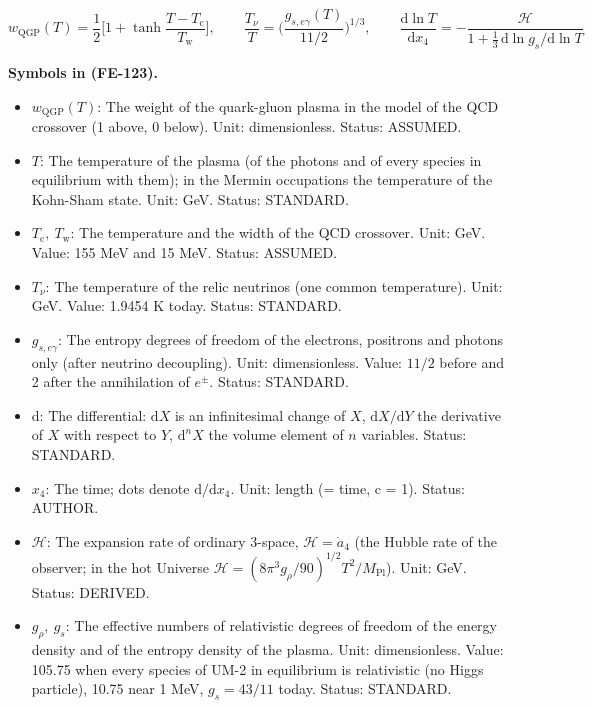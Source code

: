 \documentclass[
  10pt,
]{article}
\providecommand{\tightlist}{%
  \setlength{\itemsep}{0pt}\setlength{\parskip}{0pt}}
\begin{document}
\[
w_{\mathrm{QGP}}(T) = \frac12\Big[1 + \tanh\frac{T - T_{\mathrm{c}}}{T_{\mathrm{w}}}\Big],\qquad
\frac{T_\nu}{T} = \Big(\frac{g_{s,e\gamma}(T)}{11/2}\Big)^{1/3},\qquad
\frac{\mathrm{d}\ln T}{\mathrm{d}x_4} = -\frac{\mathcal{H}}{1 + \frac13\,\mathrm{d}\ln g_s/\mathrm{d}\ln
 T} \tag{FE-123}
\]

\textbf{Symbols in (FE-123).}

\begin{itemize}
\tightlist
\item
  \(w_{\mathrm{QGP}}(T)\): The weight of the quark-gluon plasma in the
  model of the QCD crossover (1 above, 0 below). Unit: dimensionless.
  Status: ASSUMED.
\item
  \(T\): The temperature of the plasma (of the photons and of every
  species in equilibrium with them); in the Mermin occupations the
  temperature of the Kohn-Sham state. Unit: GeV. Status: STANDARD.
\item
  \(T_{\mathrm{c}},\ T_{\mathrm{w}}\): The temperature and the width of
  the QCD crossover. Unit: GeV. Value: 155 MeV and 15 MeV. Status:
  ASSUMED.
\item
  \(T_\nu\): The temperature of the relic neutrinos (one common
  temperature). Unit: GeV. Value: 1.9454 K today. Status: STANDARD.
\item
  \(g_{s,e\gamma}\): The entropy degrees of freedom of the electrons,
  positrons and photons only (after neutrino decoupling). Unit:
  dimensionless. Value: \(11/2\) before and 2 after the annihilation of
  \(e^\pm\). Status: STANDARD.
\item
  \(\mathrm{d}\): The differential: \(\mathrm{d}X\) is an infinitesimal
  change of \(X\), \(\mathrm{d}X/\mathrm{d}Y\) the derivative of \(X\)
  with respect to \(Y\), \(\mathrm{d}^nX\) the volume element of \(n\)
  variables. Status: STANDARD.
\item
  \(x_4\): The time; dots denote \(\mathrm{d}/\mathrm{d}x_4\). Unit:
  length (= time, c = 1). Status: AUTHOR.
\item
  \(\mathcal{H}\): The expansion rate of ordinary 3-space,
  \(\mathcal{H} = \dot a_4\) (the Hubble rate of the observer; in the
  hot Universe
  \(\mathcal{H} = (8\pi^3g_\rho/90)^{1/2}T^2/M_{\mathrm{Pl}}\)). Unit:
  GeV. Status: DERIVED.
\item
  \(g_\rho,\ g_s\): The effective numbers of relativistic degrees of
  freedom of the energy density and of the entropy density of the
  plasma. Unit: dimensionless. Value: 105.75 when every species of UM-2
  in equilibrium is relativistic (no Higgs particle), 10.75 near 1 MeV,
  \(g_s = 43/11\) today. Status: STANDARD.
\end{itemize}
\end{document}
